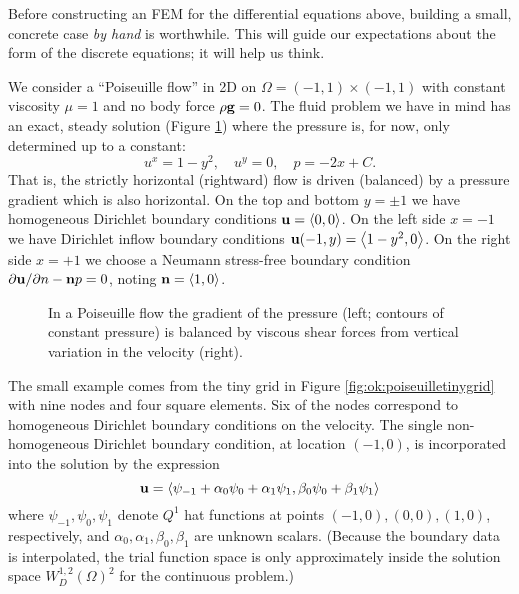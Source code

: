 Before constructing an FEM for the differential equations above, building a small, concrete case \emph{by hand} is worthwhile.  This will guide our expectations about the form of the discrete equations; it will help us think.

We consider a ``Poiseuille flow'' \citep{Acheson1990,Elmanetal2005} in 2D on $\Omega=(-1,1)\times(-1,1)$ with constant viscosity $\mu=1$ and no body force $\rho \mathbf{g}=0$.  The fluid problem we have in mind has an exact, steady solution (Figure \ref{fig:ok:poiseuillesolutions}) where the pressure is, for now, only determined up to a constant:
\begin{equation}
u^x = 1-y^2, \quad u^y=0, \quad p = -2x + C.  \label{eq:ok:poiseuilleexact}
\end{equation}
That is, the strictly horizontal (rightward) flow is driven (balanced) by a pressure gradient which is also horizontal.  On the top and bottom $y=\pm 1$ we have homogeneous Dirichlet boundary conditions $\mathbf{u}=\left<0,0\right>$.  On the left side $x=-1$ we have Dirichlet inflow boundary conditions $\mathbf{u}(-1,y) = \left<1-y^2,0\right>$.  On the right side $x=+1$ we choose a Neumann stress-free boundary condition $\partial \mathbf{u}/\partial n - \mathbf{n} p = 0$, noting $\mathbf{n} = \left<1,0\right>$.

\begin{figure}

\caption{In a Poiseuille flow the gradient of the pressure (left; contours of constant pressure) is balanced by viscous shear forces from vertical variation in the velocity (right).}
\label{fig:ok:poiseuillesolutions}
\end{figure}

The small example comes from the tiny grid in Figure \ref{fig:ok:poiseuilletinygrid} with nine nodes and four square elements.  Six of the nodes correspond to homogeneous Dirichlet boundary conditions on the velocity.  The single non-homogeneous Dirichlet boundary condition, at location $(-1,0)$, is incorporated into the solution by the expression
\begin{equation} 
\mathbf{u} = \left<\psi_{-1}+\alpha_0\psi_0+\alpha_1\psi_1,\beta_0\psi_0+\beta_1\psi_1\right>  \label{eq:ok:smallexpansionvelocity}
\end{equation}
where $\psi_{-1},\psi_0,\psi_1$ denote $Q^1$ hat functions at points $(-1,0),(0,0),(1,0)$, respectively, and $\alpha_0,\alpha_1,\beta_0,\beta_1$ are unknown scalars.  (Because the boundary data is interpolated, the trial function space is only approximately inside the solution space $W_D^{1,2}(\Omega)^2$ for the continuous problem.)

